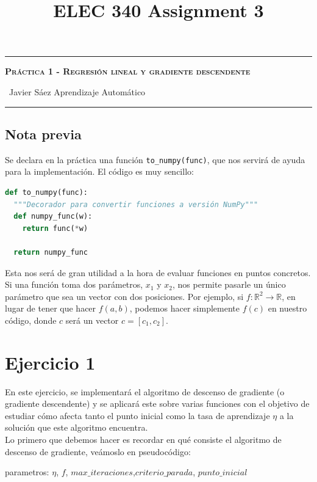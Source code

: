\documentclass[12pt]{scrartcl}
\title{ELEC 340 Assignment 3}
\begin{document}
\begin{center}
	\hrule
	\vspace{.4cm}
	{\textbf { \large \scshape{ Práctica 1 - Regresión lineal y gradiente descendente}}}
\end{center}
{\ Javier Sáez \hspace{\fill} Aprendizaje Automático  \\
	\hrule


\subsection*{Nota previa}

Se declara en la práctica una función \lstinline{to_numpy(func)}, que nos servirá de ayuda para la implementación. El código es muy sencillo:

\begin{lstlisting}[language=Python]
  def to_numpy(func):
  """Decorador para convertir funciones a versión NumPy"""
  def numpy_func(w):
    return func(*w)

  return numpy_func
\end{lstlisting}
Esta nos será de gran utilidad a la hora de evaluar funciones en puntos concretos. Si una función toma dos parámetros, $x_1$ y $x_2$, nos permite pasarle un único parámetro que sea un vector con dos posiciones.
Por ejemplo, si $f: \mathbb R^2 \to \mathbb R$, en lugar de tener que hacer $f(a,b)$, podemos hacer simplemente $f(c)$ en nuestro código, donde $c$ será un vector $c = [c_1,c_2]$.

\section*{Ejercicio 1}

En este ejercicio, se implementará el algoritmo de descenso de gradiente (o gradiente descendente) y se aplicará
este sobre varias funciones con el objetivo de estudiar cómo afecta tanto el punto inicial 
como la tasa de aprendizaje $\eta$ a la solución que este algoritmo encuentra.\\

Lo primero que debemos hacer es recordar en qué consiste el algoritmo de descenso de gradiente,
 veámoslo en pseudocódigo:\\


\begin{algorithm}[H]
\SetAlgoLined
{}
 parametros: $\eta$, $f$, $max\_iteraciones$,$criterio\_parada$, $punto\_inicial$ \;


\end{algorithm}}
\end{document}
